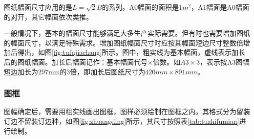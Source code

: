 图纸幅面尺寸应用的是$L=\sqrt{2}B$的系列。A0幅面的面积是$1m^2$，A1幅面是A0幅面的对开，其它幅面依次类推。

一般情况下，基本的幅面尺寸能够满足大多生产实际需要。但有时也需要增加图纸的幅面尺寸，以满足特殊需求。增加图纸幅面尺寸时应按其幅面短边尺寸整数倍增加后得出，如图\ref{fig:tufujiachang}所示。图中，粗实线为基本幅面，虚线表示加长后的图纸幅面。加长后幅面记作：基本幅面代号$\times $倍数。如$A3\times 3$，表示按A3图幅短边加长为297mm的3倍，即加长后图纸尺寸为$420mm\times 891mm$。
\subsubsection{图框}
图幅确定后，需要用粗实线画出图框，图样必须绘制在图框之内。其格式分为留装订边不留装订边种，如图\ref{fig:zhuangding}所示，其尺寸按照表\ref{tab:tuzhifumian}进行绘制。

